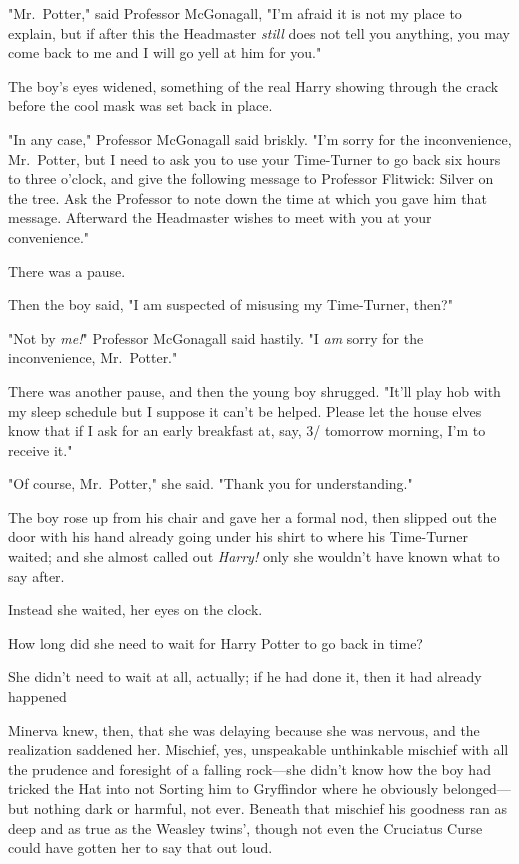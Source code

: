 "Mr.~Potter," said Professor McGonagall, "I'm afraid it is not my place to
explain, but if after this the Headmaster \emph{still} does not tell you
anything, you may come back to me and I will go yell at him for you."

The boy's eyes widened, something of the real Harry showing through the crack
before the cool mask was set back in place.

"In any case," Professor McGonagall said briskly. "I'm sorry for the
inconvenience, Mr.~Potter, but I need to ask you to use your Time-Turner to go
back six hours to three o'clock, and give the following message to Professor
Flitwick: Silver on the tree. Ask the Professor to note down the time at which
you gave him that message. Afterward the Headmaster wishes to meet with you at
your convenience."

There was a pause.

Then the boy said, "I am suspected of misusing my Time-Turner, then?"

"Not by \emph{me!}" Professor McGonagall said hastily. "I \emph{am} sorry for
the inconvenience, Mr.~Potter."

There was another pause, and then the young boy shrugged. "It'll play hob with
my sleep schedule but I suppose it can't be helped. Please let the house elves
know that if I ask for an early breakfast at, say, 3\AM/ tomorrow morning,
I'm to receive it."

"Of course, Mr.~Potter," she said. "Thank you for understanding."

The boy rose up from his chair and gave her a formal nod, then slipped out the
door with his hand already going under his shirt to where his Time-Turner
waited; and she almost called out \emph{Harry!} only she wouldn't have known
what to say after.

Instead she waited, her eyes on the clock.

How long did she need to wait for Harry Potter to go back in time?

She didn't need to wait at all, actually; if he had done it, then it had
already happened{\el}

Minerva knew, then, that she was delaying because she was nervous, and the
realization saddened her. Mischief, yes, unspeakable unthinkable mischief with
all the prudence and foresight of a falling rock---she didn't know how the boy
had tricked the Hat into not Sorting him to Gryffindor where he obviously
belonged---but nothing dark or harmful, not ever. Beneath that mischief his
goodness ran as deep and as true as the Weasley twins', though not even the
Cruciatus Curse could have gotten her to say that out loud.

